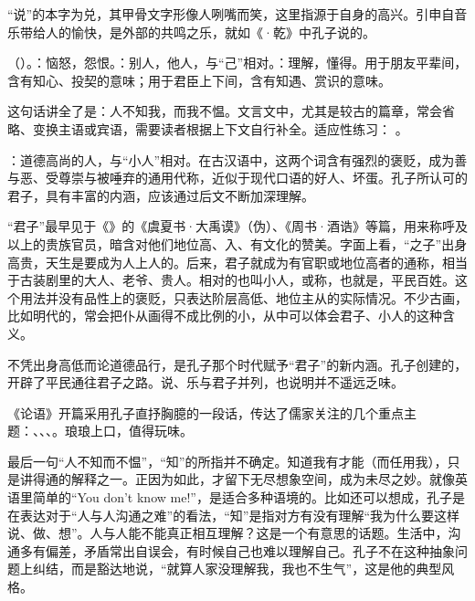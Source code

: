 {“说”的本字为兑，其甲骨文字形像人咧嘴而笑，这里指源于自身的高兴。引申自音乐带给人的愉快，是外部的共鸣之乐，就如《·乾》中孔子说的。

\item {}（）。：恼怒，怨恨。：别人，他人，与“己”相对。：理解，懂得。用于朋友平辈间，含有知心、投契的意味；用于君臣上下间，含有知遇、赏识的意味。

这句话讲全了是：人不知我，而我不愠。文言文中，尤其是较古的篇章，常会省略、变换主语或宾语，需要读者根据上下文自行补全。适应性练习：   。

\item {}：道德高尚的人，与“小人”相对。在古汉语中，这两个词含有强烈的褒贬，成为善与恶、受尊崇与被唾弃的通用代称，近似于现代口语的好人、坏蛋。孔子所认可的君子，具有丰富的内涵，应该通过后文不断加深理解。

“君子”最早见于《》的《虞夏书·大禹谟》（伪）、《周书·酒诰》等篇，用来称呼及以上的贵族官员，暗含对他们地位高、入、有文化的赞美。字面上看，“之子”出身高贵，天生是要成为人上人的。后来，君子就成为有官职或地位高者的通称，相当于古装剧里的大人、老爷、贵人。相对的也叫小人，或称，也就是，平民百姓。这个用法并没有品性上的褒贬，只表达阶层高低、地位主从的实际情况。不少古画，比如明代的，常会把仆从画得不成比例的小，从中可以体会君子、小人的这种含义。

不凭出身高低而论道德品行，是孔子那个时代赋予“君子”的新内涵。孔子创建的，开辟了平民通往君子之路。说、乐与君子并列，也说明并不遥远乏味。
}
{
《论语》开篇采用孔子直抒胸臆的一段话，传达了儒家关注的几个重点主题：、、、。琅琅上口，值得玩味。

最后一句“人不知而不愠”，“知”的所指并不确定。知道我有才能（而任用我），只是讲得通的解释之一。正因为如此，才留下无尽想象空间，成为未尽之妙。就像英语里简单的“You don't know me!”，是适合多种语境的。比如还可以想成，孔子是在表达对于“人与人沟通之难”的看法，“知”是指对方有没有理解“我为什么要这样说、做、想”。人与人能不能真正相互理解？这是一个有意思的话题。生活中，沟通多有偏差，矛盾常出自误会，有时候自己也难以理解自己。孔子不在这种抽象问题上纠结，而是豁达地说，“就算人家没理解我，我也不生气”，这是他的典型风格。
}

